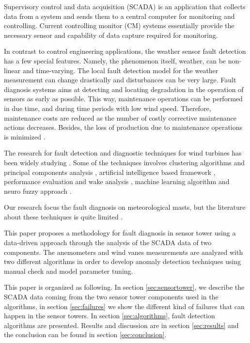\documentclass[journal]{IEEEtran}
\begin{document}
Supervisory control and data acquisition (SCADA) is an application that collects data from a system and sends them to a central computer for monitoring and controlling. Current controlling monitor (CM) systems essentially provide the necessary sensor and capability of data capture required for monitoring.

In contrast to control engineering applications, the weather sensor fault detection has a few special features. Namely, the phenomenon itself, weather, can be non-linear and time-varying. The local fault detection model for the weather measurement can change drastically and disturbances can be very large. Fault diagnosis systems aims at detecting and locating degradation in the operation of sensors as early as possible. This way, maintenance operations can be performed in due time, and during time periods with low wind speed. Therefore, maintenance costs are reduced as the number of costly corrective maintenance actions decreases. Besides, the loss of production due to maintenance operations is minimized \cite{luo2014wind}.

The research for  fault detection and diagnostic techniques for wind turbines has been widely studying  \cite{tchakoua2014wind,wymore2015survey,lu2009review}. Some of the techniques involves
clustering algorithms and principal components analysis \cite{kim2011use}, artificial intelligence based framework \cite{wang2014scada}, performance evaluation and wake analysis \cite{astolfi2016mathematical}, machine learning algorithm \cite{kusiak2011prediction,schlechtingen2011comparative} and neuro fuzzy approach \cite{schlechtingen2012condition}.

Our research focus the fault diagnosis on meteorological masts,   
but the literature about these techniques is quite limited \cite{hasu2006weather} .

This paper proposes a methodology for fault diagnosis in sensor tower using a data-driven approach through the analysis of the SCADA data of two components. The anemometers and wind vanes measurements are analyzed with two different algorithms in order to develop anomaly detection techniques using manual check and model parameter tuning. 

This paper is organized as following. In section \ref{sec:sensortower}, we describe the SCADA data coming from the two sensor tower components used in the algorithms, in section \ref{sec:failures} we show the different kind of failures that can happen in the sensor towers. In section \ref{sec:algorithms}, fault detection algorithms are presented. Results and discussion are in section \ref{sec:results} and the conclusion can be found in section \ref{sec:conclusion}.
\end{document}
